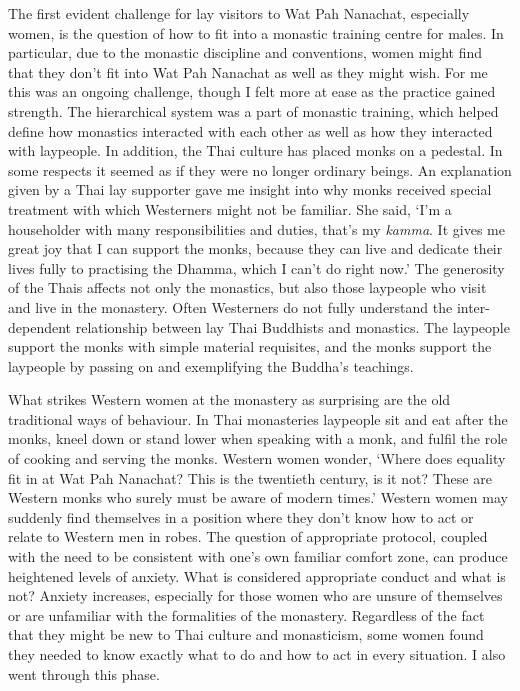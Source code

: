 The first evident challenge for lay visitors to Wat Pah Nanachat,
especially women, is the question of how to fit into a monastic training
centre for males. In particular, due to the monastic discipline and
conventions, women might find that they don't fit into Wat Pah Nanachat
as well as they might wish. For me this was an ongoing challenge, though
I felt more at ease as the practice gained strength. The hierarchical
system was a part of monastic training, which helped define how
monastics interacted with each other as well as how they interacted with
laypeople. In addition, the Thai culture has placed monks on a pedestal.
In some respects it seemed as if they were no longer ordinary beings. An
explanation given by a Thai lay supporter gave me insight into why monks
received special treatment with which Westerners might not be familiar.
She said, `I'm a householder with many responsibilities and duties,
that's my \emph{kamma}. It gives me great joy that I can support the
monks, because they can live and dedicate their lives fully to
practising the Dhamma, which I can't do right now.' The generosity of
the Thais affects not only the monastics, but also those laypeople who
visit and live in the monastery. Often Westerners do not fully
understand the inter-dependent relationship between lay Thai Buddhists
and monastics. The laypeople support the monks with simple material
requisites, and the monks support the laypeople by passing on and
exemplifying the Buddha's teachings.

What strikes Western women at the monastery as surprising are the old
traditional ways of behaviour. In Thai monasteries laypeople sit and eat
after the monks, kneel down or stand lower when speaking with a monk,
and fulfil the role of cooking and serving the monks. Western women
wonder, `Where does equality fit in at Wat Pah Nanachat? This is the
twentieth century, is it not? These are Western monks who surely must be
aware of modern times.' Western women may suddenly find themselves in a
position where they don't know how to act or relate to Western men in
robes. The question of appropriate protocol, coupled with the need to be
consistent with one's own familiar comfort zone, can produce heightened
levels of anxiety. What is considered appropriate conduct and what is
not? Anxiety increases, especially for those women who are unsure of
themselves or are unfamiliar with the formalities of the monastery.
Regardless of the fact that they might be new to Thai culture and
monasticism, some women found they needed to know exactly what to do and
how to act in every situation. I also went through this phase.

